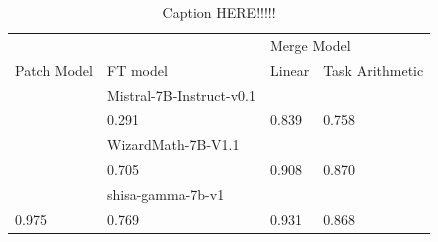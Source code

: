 \begin{table}[h]
\centering
\caption{Caption HERE!!!!!}
\label{tab:hogehogehoge}
\begin{tabular}{l|l|ll}
\hline \hline
                              &                            & \multicolumn{2}{l}{Merge Model}                                                                                      \\ \cline{3-4} 
\multirow{-2}{*}{Patch Model} & \multirow{-2}{*}{FT model} & \multicolumn{1}{l|}{Linear}                                         & Task Arithmetic                                \\ \hline
                              & Mistral-7B-Instruct-v0.1   & \multicolumn{1}{l|}{{\color[HTML]{FE0000} }}                        & {\color[HTML]{FE0000} }                        \\
                              & 0.291                      & \multicolumn{1}{l|}{\multirow{-2}{*}{{\color[HTML]{FE0000} 0.839}}} & \multirow{-2}{*}{{\color[HTML]{FE0000} 0.758}} \\ \cline{2-4} 
                              & WizardMath-7B-V1.1         & \multicolumn{1}{l|}{{\color[HTML]{FE0000} }}                        & {\color[HTML]{FE0000} }                        \\
                              & 0.705                      & \multicolumn{1}{l|}{\multirow{-2}{*}{{\color[HTML]{FE0000} 0.908}}} & \multirow{-2}{*}{{\color[HTML]{FE0000} 0.870}} \\ \cline{2-4} 
                              & shisa-gamma-7b-v1          & \multicolumn{1}{l|}{{\color[HTML]{FE0000} }}                        & {\color[HTML]{FE0000} }                        \\
\multirow{-6}{*}{0.975}       & 0.769                      & \multicolumn{1}{l|}{\multirow{-2}{*}{{\color[HTML]{FE0000} 0.931}}} & \multirow{-2}{*}{{\color[HTML]{FE0000} 0.868}} \\ \hline \hline
\end{tabular}
\end{table}




